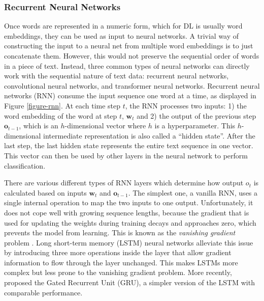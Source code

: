 \subsubsection{Recurrent Neural Networks}
Once words are represented in a numeric form, which for DL is usually word embeddings, they can be used as input to neural networks. A trivial way of constructing the input to a neural net from multiple word embeddings is to just concatenate them. However, this would not preserve the sequential order of words in a piece of text. Instead, three common types of neural networks can directly work with the sequential nature of text data: recurrent neural networks, convolutional neural networks, and transformer neural networks.\newline 
 Recurrent neural networks (RNN) consume the input sequence one word at a time, as displayed in Figure \ref{figure-rnn}. At each time step $t$, the RNN processes two inputs: 1) the word embedding of the word at step $t$, $\bm{w}_t$ and 2) the output of the previous step $\bm{o}_{t-1}$, which is an $h$-dimensional vector where $h$ is a hyperparameter. This $h$-dimensional intermediate representation is also called a ``hidden state''. After the last step, the last hidden state represents the entire text sequence in one vector. This vector can then be used by other layers in the neural network to perform classification. 



There are various different types of RNN layers which determine how output $o_t$ is calculated based on inputs $\bm{w}_t$ and $\bm{o}_{t-1}$. The simplest one, a vanilla RNN, uses a single internal operation to map the two inputs to one output. Unfortunately, it does not cope well with growing sequence lengths, because the gradient that is used for updating the weights during training decays and approaches zero, which prevents the model from learning. This is known as the \emph{vanishing gradient} problem . Long short-term memory (LSTM) neural networks  alleviate this issue by introducing three more operations inside the layer that allow gradient information to flow through the layer unchanged. This makes LSTMs more complex but less prone to the vanishing gradient problem. More recently,  proposed the Gated Recurrent Unit (GRU), a simpler version of the LSTM with comparable performance.

